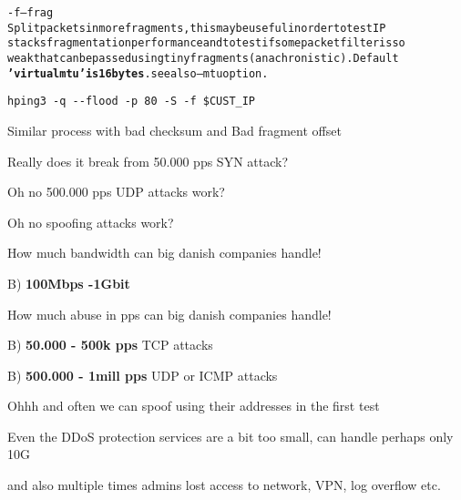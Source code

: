 \documentclass[Screen16to9,17pt]{foils}
\begin{document}
\begin{alltt}\small
-f --frag
    Split  packets  in more fragments, this may be useful in order to test IP
    stacks fragmentation performance and to test if some packet filter is  so
    weak  that  can  be  passed using tiny fragments (anachronistic). Default
    {\bf 'virtual mtu' is 16 bytes}. see also --mtu option.
\end{alltt}

\begin{list1}
\item \verb+hping3 -q --flood -p 80 -S -f $CUST_IP+
\item Similar process with bad checksum and Bad fragment offset
\end{list1}



\centerline{Really does it break from 50.000 pps SYN attack?}



\centerline{Oh no 500.000 pps UDP attacks work?}


\centerline{Oh no spoofing attacks work?}





How much bandwidth can big danish companies handle!
\begin{list2}
\item B) {\bf 100Mbps -1Gbit}
\end{list2}

How much abuse in pps can big danish companies handle!
\begin{list2}
\item B) {\bf 50.000 - 500k pps} TCP attacks
\item B) {\bf 500.000 - 1mill pps} UDP or ICMP attacks
\item Ohhh and often we can spoof using their addresses in the first test
\end{list2}

Even the DDoS protection services are a bit too small, can handle perhaps only 10G

and also multiple times admins lost access to network, VPN, log overflow etc.
\end{document}
